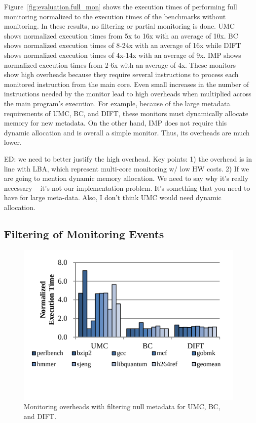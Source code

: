 Figure~\ref{fig:evaluation.full_mon} shows the execution times of
performing full monitoring normalized to the execution times of the benchmarks
without monitoring. In these results, no filtering or partial monitoring is
done. UMC shows normalized execution times from 5x to 16x with an average
of 10x. BC shows normalized execution times of 8-24x with an average of
16x while DIFT shows normalized execution times of 4x-14x with an average of
9x. IMP shows normalized execution times from 2-6x with an average of 4x. 
These monitors show high overheads because they require several
instructions to process each monitored instruction from the main core. Even
small increases in the number of instructions needed by the monitor lead to
high overheads when multiplied across the main program's execution. For
example, because of the large metadata requirements of UMC, BC, and DIFT, these
monitors must dynamically allocate memory for new metadata. On the other hand,
IMP does not require this dynamic allocation and is overall a simple monitor.
Thus, its overheads are much lower.

ED: we need to better justify the high overhead. 
Key points: 1) the overhead is in line with LBA, which represent multi-core
monitoring w/ low HW costs.
2) If we are going to mention dynamic memory allocation. We need to say why
it's really necessary -- it's not our implementation problem. It's something
that you need to have for large meta-data. Also, I don't think UMC would need
dynamic allocation.

\subsection{Filtering of Monitoring Events}

\begin{figure}
  \begin{center}
    \includegraphics[width=\columnwidth]{figs/data_filtering.pdf}
    \vspace{-0.2in}
    \caption{Monitoring overheads with filtering null metadata for UMC, BC, and DIFT.}
    \label{fig:evaluation.filtering}
    \vspace{-0.1in}
  \end{center}
\end{figure}

